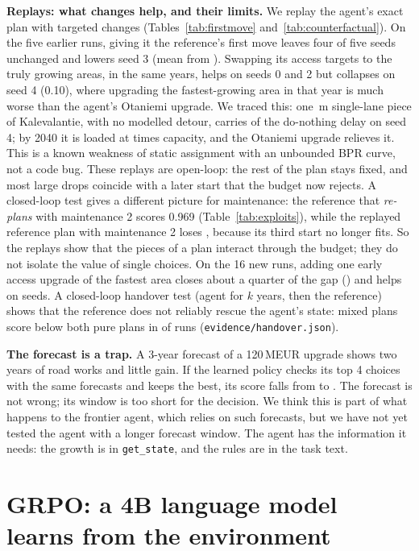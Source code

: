 \documentclass{article}
\begin{document}
\textbf{Replays: what changes help, and their limits.} We replay the agent's exact plan with targeted changes (Tables~\ref{tab:firstmove} and~\ref{tab:counterfactual}). On the five earlier runs, giving it the reference's first move leaves four of five seeds unchanged and lowers seed 3 (mean \cfFirstScore{} from \cfAgentBase{}). Swapping its access targets to the truly growing areas, in the same years, helps on seeds 0 and 2 but collapses on seed 4 (0.10), where upgrading the fastest-growing area in that year is much worse than the agent's Otaniemi upgrade. We traced this: one \sFourBottLen{}\,m single-lane piece of Kalevalantie, with no modelled detour, carries \sFourBottShare{} of the do-nothing delay on seed 4; by 2040 it is loaded at \sFourBottVC{} times capacity, and the Otaniemi upgrade relieves it. This is a known weakness of static assignment with an unbounded BPR curve, not a code bug. These replays are open-loop: the rest of the plan stays fixed, and most large drops coincide with a later start that the budget now rejects. A closed-loop test gives a different picture for maintenance: the reference that \emph{re-plans} with maintenance 2 scores 0.969 (Table~\ref{tab:exploits}), while the replayed reference plan with maintenance 2 loses \cfRefMaintTwoDiff{}, because its third start no longer fits. So the replays show that the pieces of a plan interact through the budget; they do not isolate the value of single choices. On the 16 new runs, adding one early access upgrade of the fastest area closes about a quarter of the gap (\cfAccessGapShare{}) and helps on \cfAccessAccepted{} seeds. A closed-loop handover test (agent for $k$ years, then the reference) shows that the reference does not reliably rescue the agent's state: mixed plans score below both pure plans in \handoverMixWorse{} of \handoverRuns{} runs (\texttt{evidence/handover.json}).

\textbf{The forecast is a trap.} A 3-year forecast of a 120\,MEUR upgrade shows two years of road works and little gain. If the learned policy checks its top 4 choices with the same forecasts and keeps the best, its score falls from \rlScore{} to \rlcheckScore{}. The forecast is not wrong; its window is too short for the decision. We think this is part of what happens to the frontier agent, which relies on such forecasts, but we have not yet tested the agent with a longer forecast window. The agent has the information it needs: the growth is in \texttt{get\_state}, and the rules are in the task text.

\section{GRPO: a 4B language model learns from the environment}\label{sec:grpo}
\end{document}
